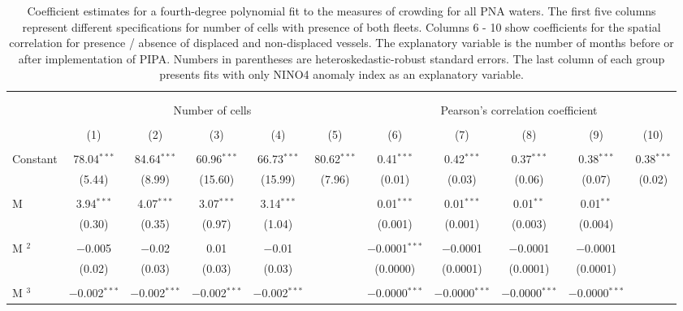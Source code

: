 \documentclass[12pt]{article}
\begin{document}
\begin{landscape}
\begin{table}[H] \centering 
  \caption{\label{tab:sp_corr}Coefficient estimates for a fourth-degree polynomial fit to the measures of crowding for all PNA waters. The first five columns represent different specifications for number of cells with presence of both fleets. Columns 6 - 10 show coefficients for the spatial correlation for presence / absence of displaced and non-displaced vessels. The explanatory variable is the number of months before or after implementation of PIPA. Numbers in parentheses are heteroskedastic-robust standard errors. The last column of each group presents fits with only NINO4 anomaly index as an explanatory variable.} 
  \label{} 
\footnotesize 
\begin{tabular}{@{\extracolsep{0.1pt}}lcccccccccc} 
\\[-1.8ex]\hline 
\hline \\[-1.8ex] 
\\[-1.8ex] & \multicolumn{5}{c}{Number of cells} & \multicolumn{5}{c}{Pearson's correlation coefficient} \\ 
\\[-1.8ex] & (1) & (2) & (3) & (4) & (5) & (6) & (7) & (8) & (9) & (10)\\ 
\hline \\[-1.8ex] 
 Constant & 78.04$^{***}$ & 84.64$^{***}$ & 60.96$^{***}$ & 66.73$^{***}$ & 80.62$^{***}$ & 0.41$^{***}$ & 0.42$^{***}$ & 0.37$^{***}$ & 0.38$^{***}$ & 0.38$^{***}$ \\ 
  & (5.44) & (8.99) & (15.60) & (15.99) & (7.96) & (0.01) & (0.03) & (0.06) & (0.07) & (0.02) \\ 
  & & & & & & & & & & \\ 
 M & 3.94$^{***}$ & 4.07$^{***}$ & 3.07$^{***}$ & 3.14$^{***}$ &  & 0.01$^{***}$ & 0.01$^{***}$ & 0.01$^{**}$ & 0.01$^{**}$ &  \\ 
  & (0.30) & (0.35) & (0.97) & (1.04) &  & (0.001) & (0.001) & (0.003) & (0.004) &  \\ 
  & & & & & & & & & & \\ 
 M $^2$ & $-$0.005 & $-$0.02 & 0.01 & $-$0.01 &  & $-$0.0001$^{***}$ & $-$0.0001 & $-$0.0001 & $-$0.0001 &  \\ 
  & (0.02) & (0.03) & (0.03) & (0.03) &  & (0.0000) & (0.0001) & (0.0001) & (0.0001) &  \\ 
  & & & & & & & & & & \\ 
 M $^3$ & $-$0.002$^{***}$ & $-$0.002$^{***}$ & $-$0.002$^{***}$ & $-$0.002$^{***}$ &  & $-$0.0000$^{***}$ & $-$0.0000$^{***}$ & $-$0.0000$^{***}$ & $-$0.0000$^{***}$ &  \\ 

\end{tabular}
\end{table}
\end{landscape}
\end{document}

